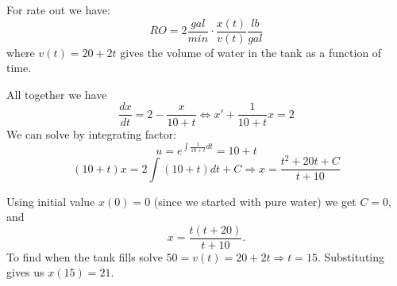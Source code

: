 \documentclass[14pt]{article}
\begin{document}
For rate out we have:
\[RO = 2 \frac{gal}{min } \cdot \frac{x(t)}{v(t)} \frac{lb}{gal}\]
where $v(t) = 20 + 2t$ gives the volume of water in the tank as a function of time.

All together we have
\[\frac{dx}{dt} = 2 - \frac{x}{10 + t } \Leftrightarrow x' + \frac{1}{10 + t} x = 2\]
We can solve by integrating factor:
\[u = e^{\int \frac{1}{10 + t } dt } = 10 + t\]
\[(10 + t ) x = 2 \int (10 + t ) dt + C \Rightarrow x = \frac{t^2 + 20 t + C}{t + 10}\]

Using initial value $x(0) = 0$ (since we started with pure water) we get $C = 0$, and 
\[  x =   \frac{t(t  + 20)  }{t + 10}.\]
To find when the tank fills solve $50 = v(t) = 20  + 2 t  \Rightarrow t =15$. Substituting gives us $x(15) = 21$.
\end{document}
